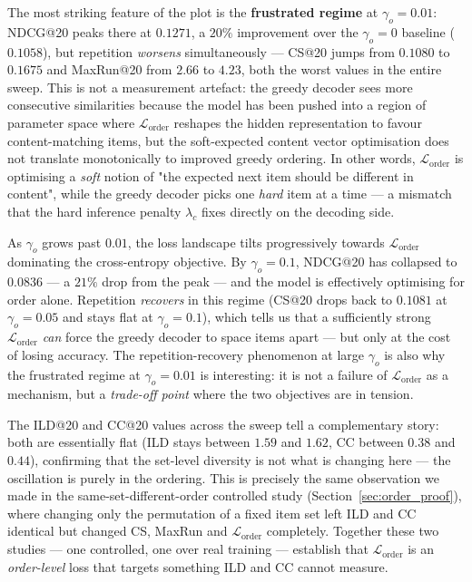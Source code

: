 The most striking feature of the plot is the \textbf{frustrated regime} at
$\gamma_o=0.01$: NDCG@20 peaks there at $0.1271$, a $20\%$ improvement over
the $\gamma_o=0$ baseline ($0.1058$), but repetition \emph{worsens}
simultaneously — CS@20 jumps from $0.1080$ to $0.1675$ and MaxRun@20 from
$2.66$ to $4.23$, both the worst values in the entire sweep. This is not a
measurement artefact: the greedy decoder sees more consecutive similarities
because the model has been pushed into a region of parameter space where
$\mathcal{L}_{\text{order}}$ reshapes the hidden representation to favour
content-matching items, but the soft-expected content vector optimisation
does not translate monotonically to improved greedy ordering. In other
words, $\mathcal{L}_{\text{order}}$ is optimising a \emph{soft} notion of
"the expected next item should be different in content", while the greedy
decoder picks one \emph{hard} item at a time — a mismatch that the hard
inference penalty $\lambda_c$ fixes directly on the decoding side.

As $\gamma_o$ grows past $0.01$, the loss landscape tilts progressively
towards $\mathcal{L}_{\text{order}}$ dominating the cross-entropy objective.
By $\gamma_o=0.1$, NDCG@20 has collapsed to $0.0836$ — a $21\%$ drop from
the peak — and the model is effectively optimising for order alone.
Repetition \emph{recovers} in this regime (CS@20 drops back to $0.1081$ at
$\gamma_o=0.05$ and stays flat at $\gamma_o=0.1$), which tells us that a
sufficiently strong $\mathcal{L}_{\text{order}}$ \emph{can} force the
greedy decoder to space items apart — but only at the cost of losing
accuracy. The repetition-recovery phenomenon at large $\gamma_o$ is also
why the frustrated regime at $\gamma_o=0.01$ is interesting: it is not a
failure of $\mathcal{L}_{\text{order}}$ as a mechanism, but a \emph{trade-off
point} where the two objectives are in tension.

The ILD@20 and CC@20 values across the sweep tell a complementary story:
both are essentially flat (ILD stays between $1.59$ and $1.62$, CC between
$0.38$ and $0.44$), confirming that the set-level diversity is not what
is changing here — the oscillation is purely in the ordering. This is
precisely the same observation we made in the same-set-different-order
controlled study (Section~\ref{sec:order_proof}), where changing only the
permutation of a fixed item set left ILD and CC identical but changed CS,
MaxRun and $\mathcal{L}_{\text{order}}$ completely. Together these two
studies — one controlled, one over real training — establish that
$\mathcal{L}_{\text{order}}$ is an \emph{order-level} loss that targets
something ILD and CC cannot measure.

